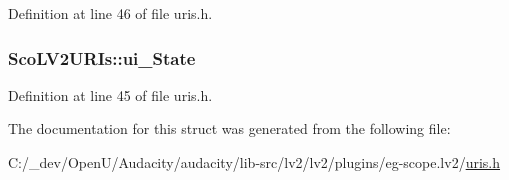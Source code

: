 Definition at line 46 of file uris.\+h.

\subsubsection[{\texorpdfstring{ui\+\_\+\+State}{ui_State}}]{ Sco\+L\+V2\+U\+R\+Is\+::ui\+\_\+\+State}\hypertarget{struct_sco_l_v2_u_r_is_a73b1f22ab52b9cde25e37b430e8366c9}{}\label{struct_sco_l_v2_u_r_is_a73b1f22ab52b9cde25e37b430e8366c9}


Definition at line 45 of file uris.\+h.



The documentation for this struct was generated from the following file\+:\begin{DoxyCompactItemize}
\item 
C\+:/\+\_\+dev/\+Open\+U/\+Audacity/audacity/lib-\/src/lv2/lv2/plugins/eg-\/scope.\+lv2/\hyperlink{eg-scope_8lv2_2uris_8h}{uris.\+h}\end{DoxyCompactItemize}
